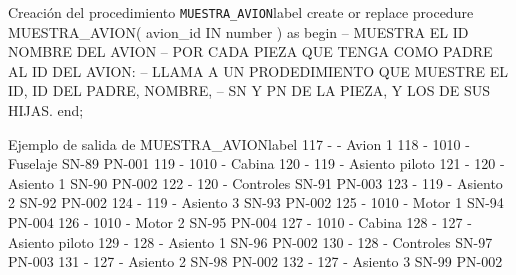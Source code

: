\begin{homeworkProblem}
\begin{listadosql}{Creación del procedimiento \texttt{MUESTRA\_AVION}}{label}
create or replace procedure MUESTRA_AVION( avion_id IN number ) 
as
begin
  -- MUESTRA EL ID NOMBRE DEL AVION
  -- POR CADA PIEZA QUE TENGA COMO PADRE AL ID DEL AVION:
  --   LLAMA A UN PRODEDIMIENTO QUE MUESTRE EL ID, ID DEL PADRE, NOMBRE, 
  --   SN Y PN DE LA PIEZA, Y LOS DE SUS HIJAS.
end;
\end{listadosql}


\begin{listadotxt}{Ejemplo de salida de MUESTRA\_AVION}{label}
117 -  - Avion 1  
    118 - 1010 - Fuselaje SN-89 PN-001
    119 - 1010 - Cabina  
        120 - 119 - Asiento piloto  
            121 - 120 - Asiento 1 SN-90 PN-002
            122 - 120 - Controles SN-91 PN-003
        123 - 119 - Asiento 2 SN-92 PN-002
        124 - 119 - Asiento 3 SN-93 PN-002
    125 - 1010 - Motor 1 SN-94 PN-004
    126 - 1010 - Motor 2 SN-95 PN-004
    127 - 1010 - Cabina  
        128 - 127 - Asiento piloto  
            129 - 128 - Asiento 1 SN-96 PN-002
            130 - 128 - Controles SN-97 PN-003
        131 - 127 - Asiento 2 SN-98 PN-002
        132 - 127 - Asiento 3 SN-99 PN-002

\end{listadotxt}
  
\end{homeworkProblem}

